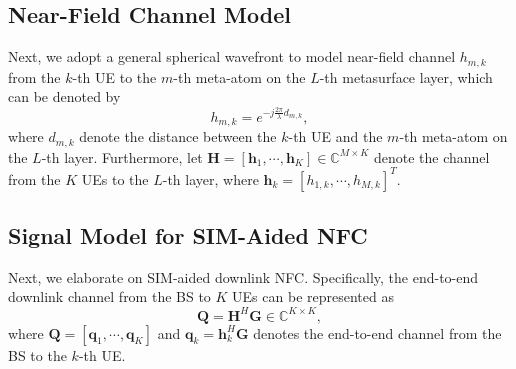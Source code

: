 \documentclass[conference]{IEEEtran}
\theoremstyle{remark}
\begin{document}
\subsection{Near-Field Channel Model}\label{II_1}
Next, we adopt a general spherical wavefront to model near-field channel ${h}_{m,k}$ from the $k$-th UE to the $m$-th meta-atom on the $L$-th metasurface layer, which can be denoted by 
\begin{equation}
{h}_{m,k}=e^{-j \frac{2 \pi}{\lambda}{{d}_{m,k}}},
\end{equation}
where ${d}_{m,k}$ denote the distance between the $k$-th UE and the $m$-th meta-atom on the $L$-th layer. 
Furthermore, let $\mathbf{H}=\left[\mathbf{h}_{1}, \cdots,\mathbf{h}_{K} \right] \in \mathbb{C}^{M \times K}$ denote the channel from the $K$ UEs to the $L$-th layer, where $\mathbf{h}_{k}=\left[{h}_{1,k},\cdots,{h}_{M,k} \right]^{T}$.

\subsection{Signal Model for SIM-Aided NFC}
Next, we elaborate on SIM-aided downlink NFC.
Specifically, the end-to-end downlink channel from the BS to $K$ UEs can be represented as
\begin{equation}
\mathbf{Q}=\mathbf{H}^{H}\mathbf{G}\in \mathbb{C}^{K \times K},
\end{equation}
where $\mathbf{Q}=\left[\mathbf{q}_{1},\cdots,\mathbf{q}_{K} \right]$ and $\mathbf{q}_{k}= \mathbf{h}^{H}_{k}\mathbf{G}$ denotes the end-to-end channel from the BS to the $k$-th UE.
\end{document}
